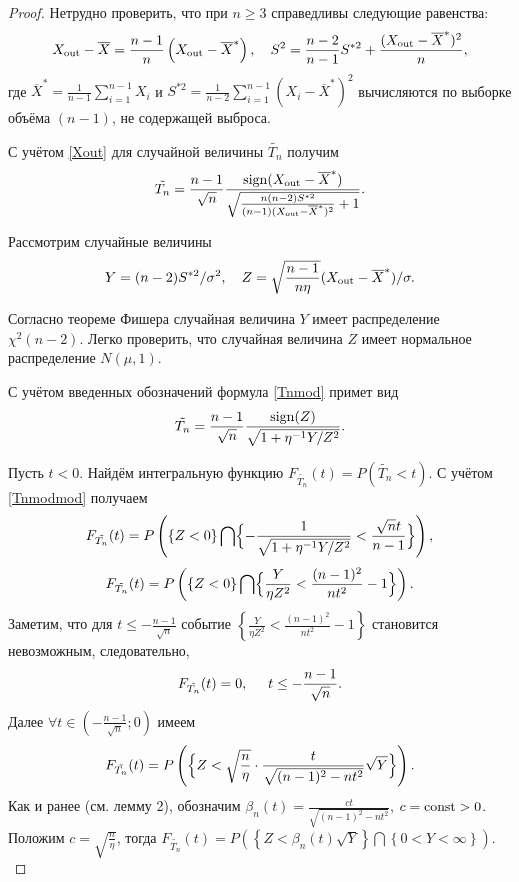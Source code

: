 \begin{proof}%
Нетрудно проверить, что при $n\ge3$ справедливы следующие
равенства:
\begin{gather}\label{Xout}
X_{\rm out}-\overline{X}=\frac{n-1}{n}\left(X_{\rm out}-\overline{X}^*\right), \quad 
S^2=\frac{n-2}{n-1}S^{*2}+\frac{(X_{\rm out}-\overline{X}^*)^{2}}{n},
\end{gather}
где $\overline{X}^*=\frac{1}{n-1}\sum\nolimits_{i=1}^{n-1}X_{i}$ и $S^{*2}=\frac{1}{n-2}\sum\nolimits_{i=1}^{n-1}(X_i-\overline{X}^*)^2$  вычисляются по выборке  объёма $(n-1)$, не содержащей выброса.

С учётом \eqref{Xout} %
для случайной величины
$\tilde{T_{n}}$ получим
\begin{equation}\label{Tnmod}
\tilde{T_{n}}=\frac{n-1}{\sqrt{n}}\frac{\mathop{\rm sign}(X_{\rm out}-\overline{X}^*)}{\sqrt{\frac{n(n-2)S^{*2}}{(n-1)(X_{\rm out}-\overline{X}^*)^2}+1}}.
\end{equation}

Рассмотрим случайные величины
\begin{equation}\label{randomZ}
Y=(n-2)S^{*2}/\sigma^2, \quad 
Z=\sqrt{\frac{n-1}{n\eta}}(X_{\rm out}-\overline{X}^*)/\sigma.
\end{equation}

 Согласно теореме Фишера \cite{Aiv} случайная величина $Y$ имеет распределение~$\chi^2(n-2)$. Легко проверить, что случайная величина
$Z$  имеет  нормальное распределение $N(\mu,1)$.

С учётом введенных обозначений формула \eqref{Tnmod}  примет вид
\begin{equation}\label{Tnmodmod}
\tilde{T_n}=\frac{n-1}{\sqrt{n}}\frac{{\rm sign}(Z)}{\sqrt{1+\eta^{-1}Y/Z^2}}.
\end{equation}

Пусть $t<0$.  Найдём интегральную функцию
$F_{\tilde{T_n}}(t)=P(\tilde{T_n}<t)$. С учётом \eqref{Tnmodmod} получаем
\[
F_{\tilde{T_n}}(t)=P
\left(
\left\{Z<0\right\}
\bigcap
\Bigl\{
-\frac{1}{\sqrt{1+\eta^{-1}Y/Z^2}}<\frac{\sqrt{n}t}{n-1}
\Bigr\}
\right),
\]
\[
F_{\tilde{T_n}}(t)=P
\left(
\left\{Z<0\right\}\bigcap
\Bigl\{
\frac{Y}{\eta Z^2}<\frac{(n-1)^2}{nt^2}-1
\Bigr\}
\right).
\]
Заметим, что для $t\le-\frac{n-1}{\sqrt{n}}$ событие
$
\left\{
\frac{Y}{\eta Z^2}<\frac{(n-1)^2}{nt^2}-1
\right\}
$
становится невозможным, следовательно,
\begin{equation}\label{FTneg}
F_{\tilde{T_n}}(t)=0,\hspace{5mm}t\le-\frac{n-1}{\sqrt{n}}.
\end{equation}
Далее $\forall t\in (-\frac{n-1}{\sqrt{n}}; 0)$ имеем
\[
F_{\tilde{T_n}}(t)=P
\left(
\Bigl\{
Z<\sqrt{\frac{n}{\eta}}\cdot\frac{t}{\sqrt{(n-1)^2-nt^2}}\sqrt{Y}
\Bigr\}
\right).
\]
Как и ранее (см. лемму 2), обозначим
$\beta_n(t)=\frac{ct}{\sqrt{(n-1)^2-nt^2}}$, $c={\rm const}>0$.
Положим $c=\sqrt{\frac{n}{\eta}}$, тогда
$F_{\tilde{T_n}}(t)=P
\left(
\left\{
Z<\beta_n(t)\sqrt{Y}
\right\}
\bigcap
\left\{ 0<Y<\infty \right\}
\right).$


\end{proof}
